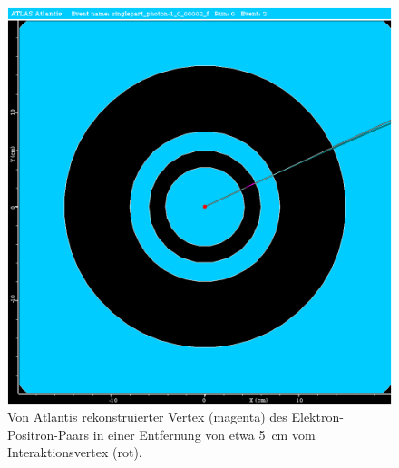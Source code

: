 \documentclass[11pt, a4paper]{article}
\numberwithin{equation}{section}
\begin{document}
\begin{figure}[htbp]
	\centering
	\includegraphics[width=1.0\textwidth]{./data/atlantis/singlepart_events_new/photons/conversion_vertex_no_fisheye.png}
	\caption{Von Atlantis rekonstruierter Vertex (magenta) des Elektron-Positron-Paars in einer Entfernung von etwa \SI{5}{\centi\meter} vom Interaktionsvertex (rot).}
	\label{fig:photon-vertex}
\end{figure}

\clearpage
\end{document}
